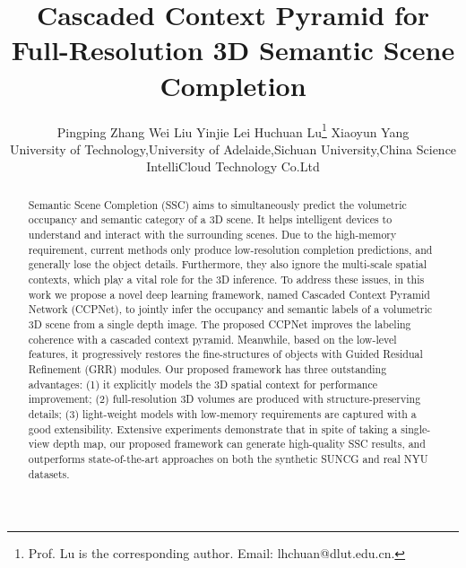 \documentclass[10pt,twocolumn,letterpaper]{article}
\begin{document}
\title{Cascaded Context Pyramid for Full-Resolution 3D Semantic Scene Completion}
\author{
Pingping Zhang\quad
Wei Liu\quad
Yinjie Lei\quad
Huchuan Lu\thanks{Prof. Lu is the corresponding author. Email: lhchuan@dlut.edu.cn.}\quad
Xiaoyun Yang\\
\smallDalian University of Technology,\quad University of Adelaide,\quad Sichuan University,\quad China Science IntelliCloud Technology Co.Ltd\\
}

\maketitle


\begin{abstract}
Semantic Scene Completion (SSC) aims to simultaneously predict the volumetric occupancy and semantic category
of a 3D scene.
It helps intelligent devices to understand and interact with the surrounding  scenes.
Due to the high-memory requirement, current methods only produce low-resolution completion predictions, and generally lose the object details.
Furthermore, they also ignore the multi-scale spatial contexts, which play a vital role for the 3D inference.
To address these issues, in this work we propose a novel deep learning framework, named Cascaded Context Pyramid Network (CCPNet), to jointly infer the occupancy and semantic labels of a volumetric 3D scene from a single depth image.
The proposed CCPNet improves the labeling coherence with a cascaded context pyramid.
Meanwhile, based on the low-level features, it progressively restores the fine-structures of objects with Guided Residual Refinement (GRR) modules.
Our proposed framework has three outstanding advantages: (1) it explicitly models the 3D spatial context for performance improvement; (2) full-resolution 3D volumes are produced with structure-preserving details; (3) light-weight models with low-memory requirements are captured with a good extensibility.
Extensive experiments demonstrate that in spite of taking a single-view depth map, our proposed framework can generate high-quality SSC results, and outperforms state-of-the-art approaches on both the synthetic SUNCG and real NYU datasets.
\end{abstract}
\end{document}
